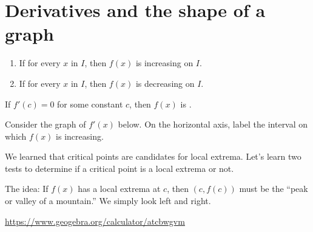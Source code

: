 \documentclass[../main.tex]{subfiles}
\begin{document}
 \section{Derivatives and the shape of a graph}

\begin{center}
  \hfill{}
  
  \hfill{}
  
  \hfill{}
  
  \hfill{}
  
  \hfill{}
\end{center}

\begin{mdframed}[style=simple-compact]
  \begin{enumerate}[label=(\alph*)]
    \item If \underline{\hspace{1.5in}} for every \(x\) in \(I\), then \(f(x)\) is increasing on \(I\).
    \item If \underline{\hspace{1.5in}} for every \(x\) in \(I\), then \(f(x)\) is decreasing on \(I\).
  \end{enumerate}
\end{mdframed}

\faStar{} If \(f'(c) = 0\) for some constant \(c\), then \(f(x)\) is \underline{\hspace{3.5in}}.

\begin{example}
  Consider the graph of \(f'(x)\) below. On the horizontal axis, label the interval on which \(f(x)\) is increasing. 

  \begin{center}
    
  \end{center}
\end{example}

We learned that critical points are candidates for local extrema. Let's learn two tests to determine if a critical point is a local extrema or not.

The idea: If \(f(x)\) has a local extrema at \(c\), then \((c,f(c))\) must be the ``peak or valley of a mountain.''  We simply look left and right.
\begin{center}
  
  \hfill
  
  \hfill
  

  \url{https://www.geogebra.org/calculator/atcbwgvm}
\end{center}
\clearpage
\end{document}
